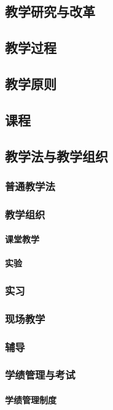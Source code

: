 \documentclass[UTF8]{../../ApplicationUniverse}
\begin{document}
    \subsection{教学研究与改革}
    \subsection{教学过程}
    \subsection{教学原则}
    \subsection{课程}
    \subsection{教学法与教学组织}
        \subsubsection{普通教学法}
        \subsubsection{教学组织}
            \paragraph{课堂教学}
            \paragraph{实验}
        \subsubsection{实习}
        \subsubsection{现场教学}
        \subsubsection{辅导}
        \subsubsection{学绩管理与考试}
            \paragraph{学绩管理制度}
\end{document}
